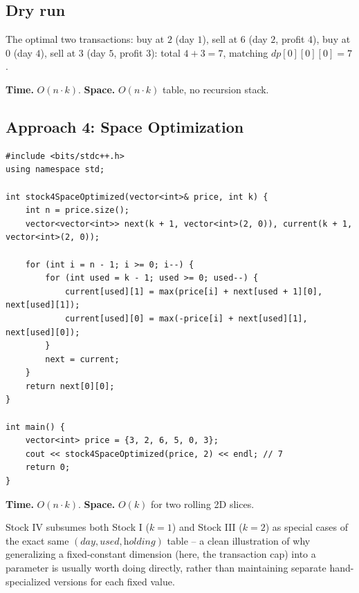\subsection*{Dry run}


The optimal two transactions: buy at $2$ (day $1$), sell at $6$ (day
$2$, profit $4$), buy at $0$ (day $4$), sell at $3$ (day $5$, profit
$3$): total $4+3=7$, matching $\textit{dp}[0][0][0]=7$.

\begin{complexitybox}
\textbf{Time.} $O(n \cdot k)$.
\textbf{Space.} $O(n \cdot k)$ table, no recursion stack.
\end{complexitybox}

\subsection*{Approach 4: Space Optimization}

\begin{lstlisting}
#include <bits/stdc++.h>
using namespace std;

int stock4SpaceOptimized(vector<int>& price, int k) {
    int n = price.size();
    vector<vector<int>> next(k + 1, vector<int>(2, 0)), current(k + 1, vector<int>(2, 0));

    for (int i = n - 1; i >= 0; i--) {
        for (int used = k - 1; used >= 0; used--) {
            current[used][1] = max(price[i] + next[used + 1][0], next[used][1]);
            current[used][0] = max(-price[i] + next[used][1], next[used][0]);
        }
        next = current;
    }
    return next[0][0];
}

int main() {
    vector<int> price = {3, 2, 6, 5, 0, 3};
    cout << stock4SpaceOptimized(price, 2) << endl; // 7
    return 0;
}
\end{lstlisting}

\begin{complexitybox}
\textbf{Time.} $O(n \cdot k)$.
\textbf{Space.} $O(k)$ for two rolling 2D slices.
\end{complexitybox}

\begin{takeawaybox}
Stock IV subsumes both Stock I ($k=1$) and Stock III ($k=2$) as special
cases of the exact same $(\textit{day}, \textit{used},
\textit{holding})$ table -- a clean illustration of why generalizing a
fixed-constant dimension (here, the transaction cap) into a parameter is
usually worth doing directly, rather than maintaining separate
hand-specialized versions for each fixed value.
\end{takeawaybox}
